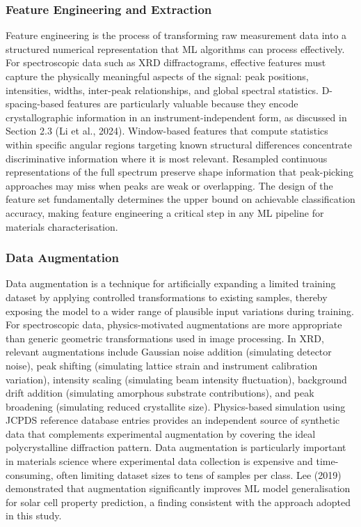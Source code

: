 \documentclass[12pt, oneside]{article} %
\begin{document}
\subsubsection{Feature Engineering and Extraction}

Feature engineering is the process of transforming raw measurement data into a structured numerical representation that ML algorithms can process effectively. For spectroscopic data such as XRD diffractograms, effective features must capture the physically meaningful aspects of the signal: peak positions, intensities, widths, inter-peak relationships, and global spectral statistics. D-spacing-based features are particularly valuable because they encode crystallographic information in an instrument-independent form, as discussed in Section 2.3 (Li et al., 2024). Window-based features that compute statistics within specific angular regions targeting known structural differences concentrate discriminative information where it is most relevant. Resampled continuous representations of the full spectrum preserve shape information that peak-picking approaches may miss when peaks are weak or overlapping. The design of the feature set fundamentally determines the upper bound on achievable classification accuracy, making feature engineering a critical step in any ML pipeline for materials characterisation.


\subsubsection{Data Augmentation}

Data augmentation is a technique for artificially expanding a limited training dataset by applying controlled transformations to existing samples, thereby exposing the model to a wider range of plausible input variations during training. For spectroscopic data, physics-motivated augmentations are more appropriate than generic geometric transformations used in image processing. In XRD, relevant augmentations include Gaussian noise addition (simulating detector noise), peak shifting (simulating lattice strain and instrument calibration variation), intensity scaling (simulating beam intensity fluctuation), background drift addition (simulating amorphous substrate contributions), and peak broadening (simulating reduced crystallite size). Physics-based simulation using JCPDS reference database entries provides an independent source of synthetic data that complements experimental augmentation by covering the ideal polycrystalline diffraction pattern. Data augmentation is particularly important in materials science where experimental data collection is expensive and time-consuming, often limiting dataset sizes to tens of samples per class. Lee (2019) demonstrated that augmentation significantly improves ML model generalisation for solar cell property prediction, a finding consistent with the approach adopted in this study.
\end{document}
